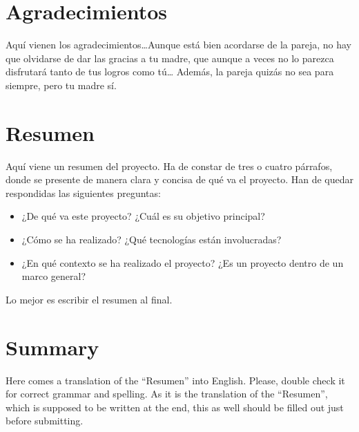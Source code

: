 \documentclass[a4paper, 12pt]{book}
\begin{document}
\chapter*{Agradecimientos}

Aquí vienen los agradecimientos\ldots Aunque está bien acordarse de la pareja, no hay que olvidarse de dar las gracias a tu madre, que aunque a veces no lo parezca disfrutará tanto de tus logros como tú\ldots
Además, la pareja quizás no sea para siempre, pero tu madre sí.


\chapter*{Resumen}

Aquí viene un resumen del proyecto.
Ha de constar de tres o cuatro párrafos, donde se presente de manera clara y concisa de qué va el proyecto.
Han de quedar respondidas las siguientes preguntas:

\begin{itemize}
  \item ¿De qué va este proyecto? ¿Cuál es su objetivo principal?
  \item ¿Cómo se ha realizado? ¿Qué tecnologías están involucradas?
  \item ¿En qué contexto se ha realizado el proyecto? ¿Es un proyecto dentro de un marco general?
\end{itemize}

Lo mejor es escribir el resumen al final.


\chapter*{Summary}

Here comes a translation of the ``Resumen'' into English.
Please, double check it for correct grammar and spelling.
As it is the translation of the ``Resumen'', which is supposed to be written at the end, this as well should be filled out just before submitting.
\end{document}
